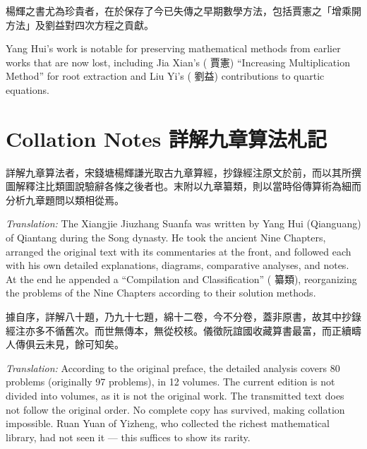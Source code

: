 \documentclass[11pt,a4paper]{article}
\newcommand{\zh}[1]{{\CJKfamily{\CJKrmdefault} #1}}
\newenvironment{chside}{%
  \begin{minipage}[t]{0.48\textwidth}%
  \setlength{\parindent}{1.5em}%
  \linespread{1.25}\selectfont%
  \small%
}{%
  \end{minipage}%
}
\newenvironment{enside}{%
  \hfill\begin{minipage}[t]{0.48\textwidth}%
  \setlength{\parindent}{1em}%
  \linespread{1.15}\selectfont%
  \small%
}{%
  \end{minipage}%
}
\begin{document}
\medskip

\noindent\begin{chside}
楊輝之書尤為珍貴者，在於保存了今已失傳之早期數學方法，包括賈憲之「增乘開方法」及劉益對四次方程之貢獻。
\end{chside}%
\begin{enside}
Yang Hui's work is notable for preserving mathematical methods from earlier
works that are now lost, including Jia Xian's (\zh{賈憲}) ``Increasing
Multiplication Method'' for root extraction and Liu Yi's (\zh{劉益})
contributions to quartic equations.
\end{enside}

\newpage

\section{Collation Notes \zh{詳解九章算法札記}}
\label{sec:collation}

\noindent\begin{chside}
\zh{詳解九章算法者，宋錢塘楊輝謙光取古九章算經，抄錄經注原文於前，而以其所撰圖解釋注比類圖說驗辭各條之後者也。末附以九章纂類，則以當時俗傳算術為細而分析九章題問以類相從焉。}
\end{chside}%
\begin{enside}
\textit{Translation:} The Xiangjie Jiuzhang Suanfa was written by Yang Hui
(Qianguang) of Qiantang during the Song dynasty. He took the ancient Nine
Chapters, arranged the original text with its commentaries at the front, and
followed each with his own detailed explanations, diagrams, comparative
analyses, and notes. At the end he appended a ``Compilation and
Classification'' (\zh{纂類}), reorganizing the problems of the Nine Chapters
according to their solution methods.
\end{enside}

\medskip

\noindent\begin{chside}
\zh{據自序，詳解八十題，乃九十七題，綿十二卷，今不分卷，蓋非原書，故其中抄錄經注亦多不循舊次。而世無傳本，無從校核。儀徵阮誼國收藏算書最富，而正續疇人傳俱云未見，餘可知矣。}
\end{chside}%
\begin{enside}
\textit{Translation:} According to the original preface, the detailed
analysis covers 80 problems (originally 97 problems), in 12 volumes. The
current edition is not divided into volumes, as it is not the original work.
The transmitted text does not follow the original order. No complete copy has
survived, making collation impossible. Ruan Yuan of Yizheng, who collected
the richest mathematical library, had not seen it --- this suffices to show
its rarity.
\end{enside}
\end{document}
